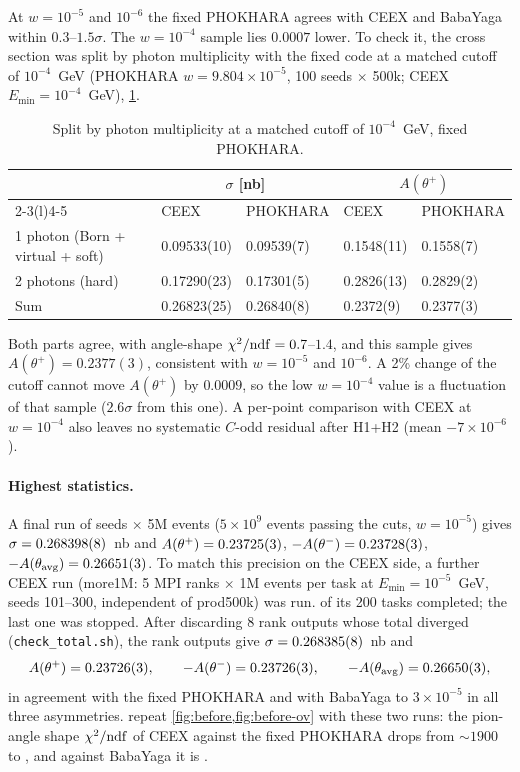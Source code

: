\documentclass[11pt,a4paper]{article}
\newcommand{\code}[1]{\texttt{#1}}
\newcommand{\phok}{PHOKHARA}
\newcommand{\ceex}{CEEX}
\newcommand{\bby}{BabaYaga}
\newcommand{\Ath}{A(\theta^+)}
\begin{document}
At $w=10^{-5}$ and $10^{-6}$ the fixed \phok{} agrees with \ceex{} and \bby{} within
$0.3$--$1.5\sigma$. The $w=10^{-4}$ sample lies $0.0007$ lower. To check it, the cross section was split
by photon multiplicity with the fixed code at a matched cutoff of $10^{-4}$~GeV
(\phok{} $w=9.804\times10^{-5}$, 100 seeds $\times$ 500k; \ceex{} $E_{\min}=10^{-4}$~GeV), \cref{tab:split}.
\begin{table}[H]
\centering\small
\caption{Split by photon multiplicity at a matched cutoff of $10^{-4}$~GeV, fixed \phok.}
\label{tab:split}
\setlength{\tabcolsep}{8pt}
\begin{tabular}{@{}lllll@{}}
\toprule
 & \multicolumn{2}{c}{$\sigma$ [nb]} & \multicolumn{2}{c}{$\Ath$} \\
\cmidrule(lr){2-3}\cmidrule(l){4-5}
 & \ceex & \phok & \ceex & \phok \\
\midrule
1 photon (Born + virtual + soft) & 0.09533(10) & 0.09539(7) & 0.1548(11) & 0.1558(7) \\
2 photons (hard)                  & 0.17290(23) & 0.17301(5) & 0.2826(13) & 0.2829(2) \\
\midrule
Sum                               & 0.26823(25) & 0.26840(8) & 0.2372(9)  & 0.2377(3) \\
\bottomrule
\end{tabular}
\end{table}
Both parts agree, with angle-shape $\chi^2/{\rm ndf}=0.7$--$1.4$, and this sample gives
$\Ath=0.2377(3)$, consistent with $w=10^{-5}$ and $10^{-6}$. A 2\% change of the cutoff cannot
move $\Ath$ by $0.0009$, so the low $w=10^{-4}$ value is a fluctuation of that sample
($2.6\sigma$ from this one). A per-point comparison with \ceex{} at $w=10^{-4}$ also leaves no systematic $C$-odd residual after
H1+H2 (mean $-7\times10^{-6}$).
\paragraph{Highest statistics.} A final run of \FiveN{} seeds $\times$ 5M events
($5\times10^9$ events passing the cuts, $w=10^{-5}$) gives $\sigma=0.268398(8)$~nb and
$\Ath=\FiveA$, $-A(\theta^-)=0.23728(3)$, $-A(\theta_{\rm avg})=0.26651(3)$. To match this precision
on the \ceex{} side, a further \ceex{} run (more1M: 5 MPI ranks $\times$ 1M events per task at
$E_{\min}=10^{-5}$~GeV, seeds 101--300, independent of prod500k) was run. \CeexN{} of its 200 tasks
completed; the last one was stopped. After discarding 8 rank outputs whose total diverged
(\code{check\_total.sh}), the \CeexNr{} rank outputs give
$\sigma=0.268385(8)$~nb and
\[
  \Ath=\CeexA,\qquad -A(\theta^-)=\CeexAm,\qquad -A(\theta_{\rm avg})=\CeexAv ,
\]
in agreement with the fixed \phok{} and with \bby{} to $3\times10^{-5}$ in all three asymmetries.
 repeat \cref{fig:before,fig:before-ov} with these two runs: the
pion-angle shape $\chi^2/{\rm ndf}$ of \ceex{} against the fixed \phok{} drops from $\sim1900$ to
\FiveChiC{}, and against \bby{} it is \FiveChiB.
\end{document}
